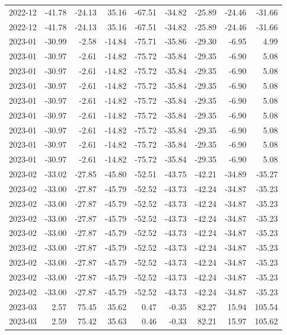 \begin{table}[ht]
\begin{tabular}{lrrrrrrrr}
  2022-12 & -41.78 & -24.13 & 35.16 & -67.51 & -34.82 & -25.89 & -24.46 & -31.66 \\ 
  2022-12 & -41.78 & -24.13 & 35.16 & -67.51 & -34.82 & -25.89 & -24.46 & -31.66 \\ 
  2023-01 & -30.99 & -2.58 & -14.84 & -75.71 & -35.86 & -29.30 & -6.95 & 4.99 \\ 
  2023-01 & -30.97 & -2.61 & -14.82 & -75.72 & -35.84 & -29.35 & -6.90 & 5.08 \\ 
  2023-01 & -30.97 & -2.61 & -14.82 & -75.72 & -35.84 & -29.35 & -6.90 & 5.08 \\ 
  2023-01 & -30.97 & -2.61 & -14.82 & -75.72 & -35.84 & -29.35 & -6.90 & 5.08 \\ 
  2023-01 & -30.97 & -2.61 & -14.82 & -75.72 & -35.84 & -29.35 & -6.90 & 5.08 \\ 
  2023-01 & -30.97 & -2.61 & -14.82 & -75.72 & -35.84 & -29.35 & -6.90 & 5.08 \\ 
  2023-01 & -30.97 & -2.61 & -14.82 & -75.72 & -35.84 & -29.35 & -6.90 & 5.08 \\ 
  2023-01 & -30.97 & -2.61 & -14.82 & -75.72 & -35.84 & -29.35 & -6.90 & 5.08 \\ 
  2023-01 & -30.97 & -2.61 & -14.82 & -75.72 & -35.84 & -29.35 & -6.90 & 5.08 \\ 
  2023-02 & -33.02 & -27.85 & -45.80 & -52.51 & -43.75 & -42.21 & -34.89 & -35.27 \\ 
  2023-02 & -33.00 & -27.87 & -45.79 & -52.52 & -43.73 & -42.24 & -34.87 & -35.23 \\ 
  2023-02 & -33.00 & -27.87 & -45.79 & -52.52 & -43.73 & -42.24 & -34.87 & -35.23 \\ 
  2023-02 & -33.00 & -27.87 & -45.79 & -52.52 & -43.73 & -42.24 & -34.87 & -35.23 \\ 
  2023-02 & -33.00 & -27.87 & -45.79 & -52.52 & -43.73 & -42.24 & -34.87 & -35.23 \\ 
  2023-02 & -33.00 & -27.87 & -45.79 & -52.52 & -43.73 & -42.24 & -34.87 & -35.23 \\ 
  2023-02 & -33.00 & -27.87 & -45.79 & -52.52 & -43.73 & -42.24 & -34.87 & -35.23 \\ 
  2023-02 & -33.00 & -27.87 & -45.79 & -52.52 & -43.73 & -42.24 & -34.87 & -35.23 \\ 
  2023-02 & -33.00 & -27.87 & -45.79 & -52.52 & -43.73 & -42.24 & -34.87 & -35.23 \\ 
  2023-03 & 2.57 & 75.45 & 35.62 & 0.47 & -0.35 & 82.27 & 15.94 & 105.54 \\ 
  2023-03 & 2.59 & 75.42 & 35.63 & 0.46 & -0.33 & 82.21 & 15.97 & 105.62 \\ 

\end{tabular}
\end{table}
